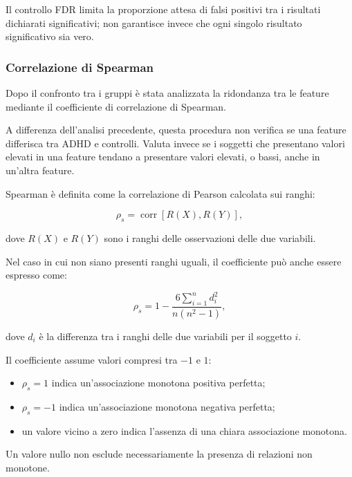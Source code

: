 Il controllo FDR limita la proporzione attesa di falsi positivi tra i
risultati dichiarati significativi; non garantisce invece che ogni
singolo risultato significativo sia vero.


\subsubsection{Correlazione di Spearman}

Dopo il confronto tra i gruppi è stata analizzata la ridondanza tra le
feature mediante il coefficiente di correlazione di Spearman.

A differenza dell'analisi precedente, questa procedura non verifica se
una feature differisca tra ADHD e controlli. Valuta invece se i
soggetti che presentano valori elevati in una feature tendano a
presentare valori elevati, o bassi, anche in un'altra feature.

Spearman è definita come la correlazione di Pearson calcolata sui
ranghi:

\begin{equation}
	\rho_s
	=
	\operatorname{corr}
	\left[
	R(X),R(Y)
	\right],
\end{equation}

dove $R(X)$ e $R(Y)$ sono i ranghi delle osservazioni delle due
variabili.

Nel caso in cui non siano presenti ranghi uguali, il coefficiente può
anche essere espresso come:

\begin{equation}
	\rho_s
	=
	1
	-
	\frac{
		6\sum_{i=1}^{n}d_i^2
	}{
		n(n^2-1)
	},
\end{equation}

dove $d_i$ è la differenza tra i ranghi delle due variabili per il
soggetto $i$.

Il coefficiente assume valori compresi tra $-1$ e $1$:

\begin{itemize}
	\item $\rho_s=1$ indica un'associazione monotona positiva
	perfetta;
	
	\item $\rho_s=-1$ indica un'associazione monotona negativa
	perfetta;
	
	\item un valore vicino a zero indica l'assenza di una chiara
	associazione monotona.
\end{itemize}

Un valore nullo non esclude necessariamente la presenza di relazioni
non monotone.

